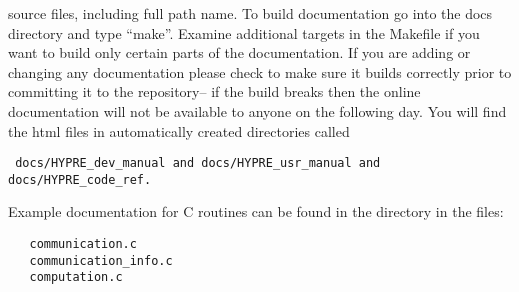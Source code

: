 source files, including full path name.
\newline\newline To build documentation go into the docs directory and type
``make''.  Examine additional targets in the Makefile if you want to build only
certain parts of the documentation.  If you are adding or changing any
documentation please check to make sure it builds correctly prior to committing
it to the repository-- if the build breaks then the online documentation will
not be available to anyone on the following day. You will find the html files
in automatically created directories called
\begin{verbatim} docs/HYPRE_dev_manual and docs/HYPRE_usr_manual and docs/HYPRE_code_ref.\end{verbatim}

Example documentation for C routines can be found in the directory
 in the files:
\begin{verbatim}
   communication.c
   communication_info.c
   computation.c
\end{verbatim}
